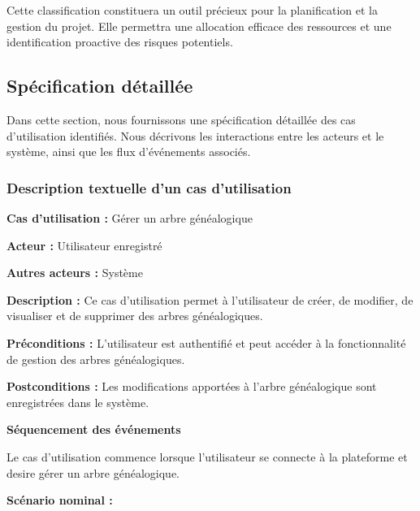 Cette classification constituera un outil précieux pour la planification et la
gestion du projet. Elle permettra une allocation efficace des ressources et
une identification proactive des risques potentiels.

\newpage

\subsection{Spécification détaillée }
Dans cette section, nous fournissons une spécification détaillée des cas
d’utilisation identifiés. Nous décrivons les interactions entre les acteurs et
le système, ainsi que les flux d’événements associés.

\subsubsection{Description textuelle d'un cas d'utilisation}
\textbf{Cas d’utilisation :} Gérer un arbre généalogique

\textbf{Acteur :} Utilisateur enregistré

\textbf{Autres acteurs :} Système

\textbf{Description :} Ce cas d’utilisation permet à l’utilisateur de créer,
de modifier, de visualiser et de supprimer des arbres généalogiques.

\textbf{Préconditions :} L’utilisateur est authentifié et peut accéder à la
fonctionnalité de gestion des arbres généalogiques.

\textbf{Postconditions :} Les modifications apportées à l'arbre généalogique
sont enregistrées dans le système.

\textbf{Séquencement des événements}

Le cas d’utilisation commence lorsque l’utilisateur se connecte à la plateforme
et desire gérer un arbre généalogique.

\textbf{Scénario nominal :}

